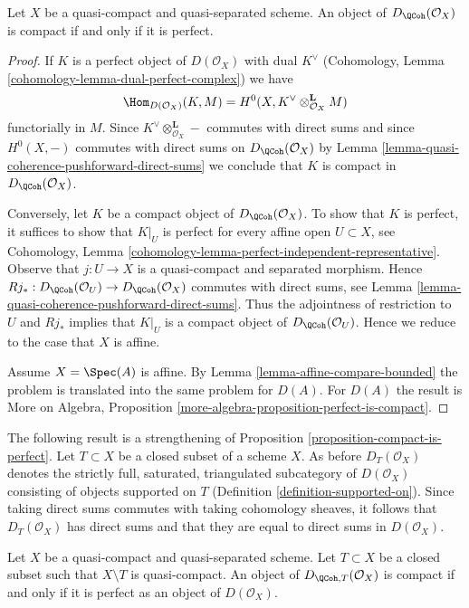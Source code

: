 \begin{proposition}
\label{proposition-compact-is-perfect}
Let $X$ be a quasi-compact and quasi-separated scheme.
An object of $D_\QCoh(\mathcal{O}_X)$ is compact
if and only if it is perfect.
\end{proposition}

\begin{proof}
If $K$ is a perfect object of $D(\mathcal{O}_X)$ with dual
$K^\vee$ (Cohomology, Lemma \ref{cohomology-lemma-dual-perfect-complex})
we have
$$
\Hom_{D(\mathcal{O}_X)}(K, M) =
H^0(X, K^\vee \otimes_{\mathcal{O}_X}^\mathbf{L} M)
$$
functorially in $M$. Since $K^\vee \otimes_{\mathcal{O}_X}^\mathbf{L} -$
commutes with direct sums and since $H^0(X, -)$ commutes with direct
sums on $D_\QCoh(\mathcal{O}_X)$ by
Lemma \ref{lemma-quasi-coherence-pushforward-direct-sums}
we conclude that $K$ is compact in $D_\QCoh(\mathcal{O}_X)$.

\medskip\noindent
Conversely, let $K$ be a compact object of $D_\QCoh(\mathcal{O}_X)$.
To show that $K$ is perfect, it suffices to show that
$K|_U$ is perfect for every affine open $U \subset X$, see
Cohomology, Lemma \ref{cohomology-lemma-perfect-independent-representative}.
Observe that $j : U \to X$ is a quasi-compact and separated morphism.
Hence
$Rj_* : D_\QCoh(\mathcal{O}_U) \to D_\QCoh(\mathcal{O}_X)$
commutes with direct sums, see
Lemma \ref{lemma-quasi-coherence-pushforward-direct-sums}.
Thus the adjointness of restriction to $U$ and $Rj_*$ implies that
$K|_U$ is a compact object of $D_\QCoh(\mathcal{O}_U)$.
Hence we reduce to the case that $X$ is affine.

\medskip\noindent
Assume $X = \Spec(A)$ is affine. By Lemma \ref{lemma-affine-compare-bounded}
the problem is translated into the same problem for $D(A)$.
For $D(A)$ the result is
More on Algebra, Proposition \ref{more-algebra-proposition-perfect-is-compact}.
\end{proof}

\noindent
The following result is a strengthening of
Proposition \ref{proposition-compact-is-perfect}.
Let $T \subset X$ be a closed subset of a scheme $X$. As before
$D_T(\mathcal{O}_X)$ denotes the strictly full, saturated,
triangulated subcategory of $D(\mathcal{O}_X)$ consisting of objects
supported on $T$ (Definition \ref{definition-supported-on}).
Since taking direct sums commutes with taking cohomology sheaves, it follows
that $D_T(\mathcal{O}_X)$ has direct sums and that they are equal
to direct sums in $D(\mathcal{O}_X)$.

\begin{lemma}
\label{lemma-compact-is-perfect-with-support}
Let $X$ be a quasi-compact and quasi-separated scheme.
Let $T \subset X$ be a closed subset such that $X \setminus T$
is quasi-compact. An object of $D_{\QCoh, T}(\mathcal{O}_X)$ is compact
if and only if it is perfect as an object of $D(\mathcal{O}_X)$.
\end{lemma}

